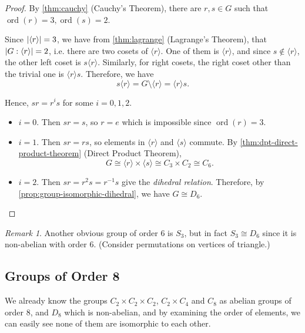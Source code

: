\documentclass{article}
\theoremstyle{definition}
\theoremstyle{remark}
\newtheorem{remark}[theorem]{Remark}
\DeclarePairedDelimiter{\abs}{\lvert}{\rvert}
\newcommand{\pqty}[1]{\left(#1\right)}
\newcommand{\angBrac}[1]{\langle #1\rangle}
\newcommand{\inverse}{^{-1}}
\newcommand{\isomorphic}{\cong}
\newcommand{\ord}{\operatorname{ord}}
\begin{document}
\begin{proof}
    By \autoref{thm:cauchy} (Cauchy's Theorem), there are \(r, s \in G\) such that \(\ord\pqty{r} = 3, \ord\pqty{s} = 2\).

    Since \(\abs{\angBrac{r}} = 3\), we have from \autoref{thm:lagrange} (Lagrange's Theorem), that \(\abs{G : \angBrac{r}} = 2\), i.e. there are two cosets of \(\angBrac{r}\). One of them is \(\angBrac{r}\), and since \(s \notin \angBrac{r}\), the other left coset is \(s\angBrac{r}\). Similarly, for right cosets, the right coset other than the trivial one is \(\angBrac{r}s\). Therefore, we have
    \[
        s\angBrac{r} = G \setminus \angBrac{r} = \angBrac{r} s.
    \]

    Hence, \(sr = r^i s\) for some \(i = 0, 1, 2\).

    \begin{itemize}
        \item \(i = 0\). Then \(sr = s\), so \(r = e\) which is impossible since \(\ord\pqty{r} = 3\).
        \item \(i = 1\). Then \(sr = rs\), so elements in \(\angBrac{r}\) and \(\angBrac{s}\) commute. By \autoref{thm:dpt-direct-product-theorem} (Direct Product Theorem),
        \[
            G \isomorphic \angBrac{r} \times \angBrac{s} \isomorphic C_3 \times C_2 \isomorphic C_6.
        \]
        \item \(i = 2\). Then \(sr = r^2 s = r\inverse s\) give the \emph{dihedral relation}. Therefore, by \autoref{prop:group-isomorphic-dihedral}, we have \(G \isomorphic D_6\).
    \end{itemize}
\end{proof}

\begin{remark}
    Another obvious group of order \(6\) is \(S_3\), but in fact \(S_3 \isomorphic D_6\) since it is non-abelian with order \(6\). (Consider permutations on vertices of triangle.)
\end{remark}

\subsection{Groups of Order 8}
\label{sec:groups-of-order-8}

We already know the groups \(C_2 \times C_2 \times C_2\), \(C_2 \times C_4\) and \(C_8\) as abelian groups of order 8, and \(D_8\) which is non-abelian, and by examining the order of elements, we can easily see none of them are isomorphic to each other.
\end{document}
